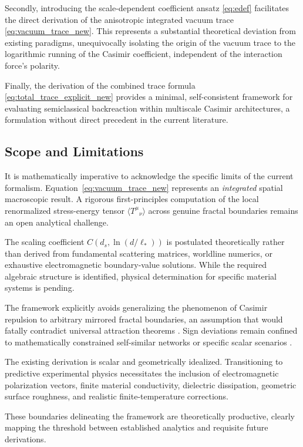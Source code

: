 \documentclass[12pt,letterpaper]{article}
\begin{document}
Secondly, introducing the scale-dependent coefficient ansatz \eqref{eq:edef} facilitates the direct derivation of the anisotropic integrated vacuum trace \eqref{eq:vacuum_trace_new}.
This represents a substantial theoretical deviation from existing paradigms, unequivocally isolating the origin of the vacuum trace to the logarithmic running of the Casimir coefficient, independent of the interaction force's polarity.

Finally, the derivation of the combined trace formula \eqref{eq:total_trace_explicit_new} provides a minimal, self-consistent framework for evaluating semiclassical backreaction within multiscale Casimir architectures, a formulation without direct precedent in the current literature.

\subsection{Scope and Limitations}

It is mathematically imperative to acknowledge the specific limits of the current formalism.
Equation~\eqref{eq:vacuum_trace_new} represents an \emph{integrated} spatial macroscopic result. A rigorous first-principles computation of the local renormalized stress-energy tensor $\langle T^\mu{}_{\nu}\rangle$ across genuine fractal boundaries remains an open analytical challenge.

The scaling coefficient $C(d_s,\ln(d/\ell_*))$ is postulated theoretically rather than derived from fundamental scattering matrices, worldline numerics, or exhaustive electromagnetic boundary-value solutions.
While the required algebraic structure is identified, physical determination for specific material systems is pending.

The framework explicitly avoids generalizing the phenomenon of Casimir repulsion to arbitrary mirrored fractal boundaries, an assumption that would fatally contradict universal attraction theorems \cite{kennethklich2006}.
Sign deviations remain confined to mathematically constrained self-similar networks or specific scalar scenarios \cite{shajesh2016}.

The existing derivation is scalar and geometrically idealized. Transitioning to predictive experimental physics necessitates the inclusion of electromagnetic polarization vectors, finite material conductivity, dielectric dissipation, geometric surface roughness, and realistic finite-temperature corrections.

These boundaries delineating the framework are theoretically productive, clearly mapping the threshold between established analytics and requisite future derivations.
\end{document}
